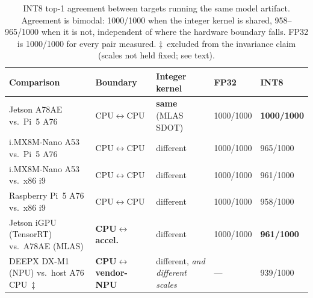 \documentclass[11pt]{article}
\begin{document}
\begin{table}[htbp]
\centering
\small
\begin{tabular}{L{4.4cm} L{2.6cm} L{3.0cm} C{1.4cm} C{1.6cm}}
\toprule
\textbf{Comparison} & \textbf{Boundary} & \textbf{Integer kernel} & \textbf{FP32} & \textbf{INT8} \\
\midrule
Jetson A78AE vs.\ Pi~5 A76 & CPU$\leftrightarrow$CPU & \textbf{same} (MLAS SDOT) & 1000/1000 & \textbf{1000/1000} \\
i.MX8M-Nano A53 vs.\ Pi~5 A76 & CPU$\leftrightarrow$CPU & different & 1000/1000 & 965/1000 \\
i.MX8M-Nano A53 vs.\ x86 i9 & CPU$\leftrightarrow$CPU & different & 1000/1000 & 961/1000 \\
Raspberry Pi~5 A76 vs.\ x86 i9 & CPU$\leftrightarrow$CPU & different & 1000/1000 & 958/1000 \\
Jetson iGPU (TensorRT) vs.\ A78AE (MLAS) & \textbf{CPU$\leftrightarrow$accel.} & different & 1000/1000 & \textbf{961/1000} \\
DEEPX DX-M1 (NPU) vs.\ host A76 CPU~$\ddagger$ & \textbf{CPU$\leftrightarrow$vendor-NPU} & different, \emph{and different scales} & --- & 939/1000 \\
\bottomrule
\end{tabular}
\caption{INT8 top-1 agreement between targets running the same model artifact. Agreement is bimodal: 1000/1000 when the integer kernel is shared, 958--965/1000 when it is not, independent of where the hardware boundary falls. FP32 is 1000/1000 for every pair measured. $\ddagger$~excluded from the invariance claim (scales not held fixed; see text).}
\label{tab:c2}
\end{table}
\end{document}
